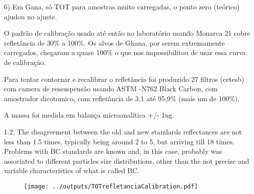 6) Em Gana, só TOT para amostras muito carregadas, o ponto zero (teórico)
ajudou no ajuste.

O padrão de calibração usado até então no laboratório usando Monarca 21 cobre refletância de 30\% a 100\%. 
Os alvos de Ghana, por serem extremamente carregados, chegaram a quase 100\% o que nos impossibilitou de usar 
essa curva de calibração.  

Para tentar contornar e recalibrar o refletância foi produzido 27 filtros (cetesb) com camera de ressuspensão
usando ASTM -N762 Black Carbon, com amostrador dicotomico, com refletância de 3,1 até 95,9\% (mais um de 100\%).

A massa foi medida em balança microanalítica +/- 1ug.







1.2. The disagreement between the old and new standards reflectances are not less than 1.5 times, typically being around 2 to 5, but arriving till 18 times. Problems with BC standards are known and, in this case, probably was associated to different particles size distributions, other than the not precise and variable characteristics of what is called BC.





\begin{table}[H]
  \centering
  \begin{scriptsize}
    
  \end{scriptsize}
\end{table}


\begin{figure}[H]
\begin{center}
  \texttt{[image: ../outputs/TOTrefletanciaCalibration.pdf]}
  \caption{}
\end{center}
\end{figure}
